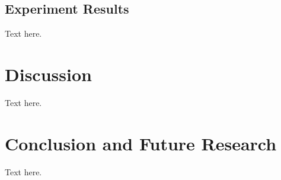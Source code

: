 \documentclass{article}
\begin{document}
\subsection{Experiment Results} 
Text here.


\section{Discussion}

Text here.

\section{Conclusion and Future Research}

Text here.




\end{document}
